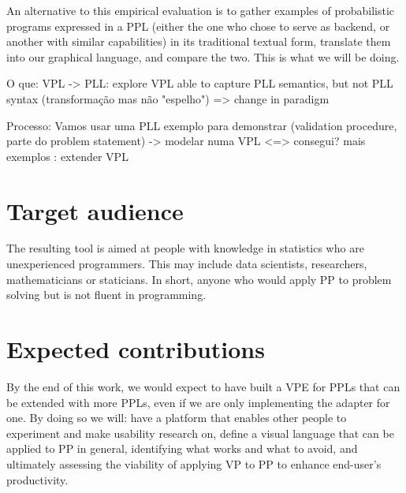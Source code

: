 An alternative to this empirical evaluation is to gather examples of probabilistic programs expressed in a
PPL (either the one who chose to serve as backend, or another with similar
capabilities) in its traditional textual form, translate them into our graphical
language, and compare the two. This is what we will be doing.

O que: VPL -> PLL: explore VPL able to capture PLL semantics, but not PLL syntax (transformação mas não "espelho") => change in paradigm

Processo: Vamos usar uma PLL exemplo para demonstrar (validation procedure, parte do problem statement) -> modelar numa VPL <=> consegui? mais exemplos : extender VPL

\section{Target audience}\label{sec:audience}

The resulting tool is aimed at people with knowledge in statistics
who are unexperienced programmers. This may include data scientists, researchers,
mathematicians or staticians. In short, anyone who would apply PP to problem
solving but is not fluent in programming.

\section{Expected contributions}

By the end of this work, we would expect to have built a VPE for PPLs that can
be extended with more PPLs, even if we are only implementing the adapter for one.
By doing so we will: have a platform that enables other people to experiment
and make usability research on, define a visual language that can be applied to PP in general,
identifying what works and what to avoid,
and ultimately assessing the viability of applying VP to PP to enhance end-user's
productivity.
